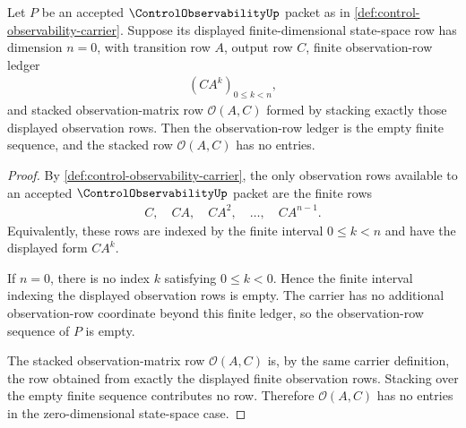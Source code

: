 \begin{theorem}
\label{thm:control-observability-zero-dimensional-observation-ledger}
Let $P$ be an accepted $\ControlObservabilityUp$ packet as in \autoref{def:control-observability-carrier}. Suppose its displayed finite-dimensional state-space row has dimension $n=0$, with transition row $A$, output row $C$, finite observation-row ledger
$$
\begin{aligned}
(CA^k)_{0\leq k<n},
\end{aligned}
$$
and stacked observation-matrix row $\mathcal O(A,C)$ formed by stacking exactly those displayed observation rows. Then the observation-row ledger is the empty finite sequence, and the stacked row $\mathcal O(A,C)$ has no entries.
\end{theorem}
\begin{proof}
By \autoref{def:control-observability-carrier}, the only observation rows available to an accepted $\ControlObservabilityUp$ packet are the finite rows
$$
\begin{aligned}
C,\quad CA,\quad CA^2,\quad \ldots,\quad CA^{n-1}.
\end{aligned}
$$
Equivalently, these rows are indexed by the finite interval $0\leq k<n$ and have the displayed form $CA^k$.

If $n=0$, there is no index $k$ satisfying $0\leq k<0$. Hence the finite interval indexing the displayed observation rows is empty. The carrier has no additional observation-row coordinate beyond this finite ledger, so the observation-row sequence of $P$ is empty.

The stacked observation-matrix row $\mathcal O(A,C)$ is, by the same carrier definition, the row obtained from exactly the displayed finite observation rows. Stacking over the empty finite sequence contributes no row. Therefore $\mathcal O(A,C)$ has no entries in the zero-dimensional state-space case.
\end{proof}
